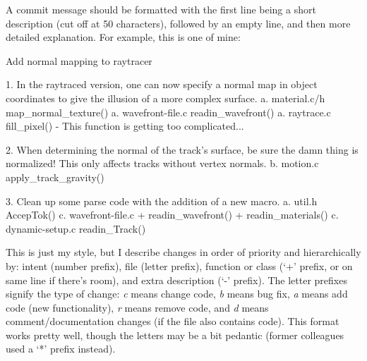 A commit message should be formatted with the first line being a short description (cut off at 50 characters), followed by an empty line, and then more detailed explanation.
For example, this is one of mine:
\begin{code}
Add normal mapping to raytracer

1. In the raytraced version, one can now specify a normal map in
   object coordinates to give the illusion of a more complex surface.
  a. material.c/h  map_normal_texture()
  a. wavefront-file.c  readin_wavefront()
  a. raytrace.c  fill_pixel()
     - This function is getting too complicated...

2. When determining the normal of the track's surface, be sure the damn
   thing is normalized! This only affects tracks without vertex normals.
  b. motion.c  apply_track_gravity()

3. Clean up some parse code with the addition of a new macro.
  a. util.h  AccepTok()
  c. wavefront-file.c
    + readin_wavefront()
    + readin_materials()
  c. dynamic-setup.c  readin_Track()
\end{code}
This is just my style, but I describe changes in order of priority and hierarchically by: intent (number prefix), file (letter prefix), function or class (`+' prefix, or on same line if there's room), and extra description (`-' prefix).
The letter prefixes signify the type of change: \textit{c} means change code, \textit{b} means bug fix, \textit{a} means add code (new functionality), \textit{r} means remove code, and \textit{d} means comment/documentation changes (if the file also contains code).
This format works pretty well, though the letters may be a bit pedantic (former colleagues used a `*' prefix instead).



